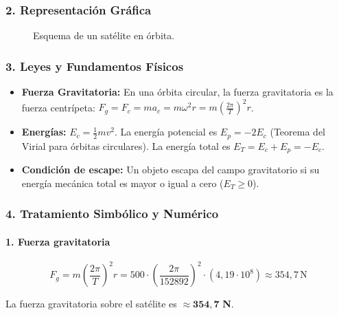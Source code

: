 \subsubsection*{2. Representación Gráfica}
\begin{figure}[H]
    \centering
    \caption{Esquema de un satélite en órbita.}
\end{figure}

\subsubsection*{3. Leyes y Fundamentos Físicos}
\begin{itemize}
    \item \textbf{Fuerza Gravitatoria:} En una órbita circular, la fuerza gravitatoria es la fuerza centrípeta: $F_g = F_c = m a_c = m \omega^2 r = m \left(\frac{2\pi}{T}\right)^2 r$.
    \item \textbf{Energías:} $E_c = \frac{1}{2}mv^2$. La energía potencial es $E_p = -2E_c$ (Teorema del Virial para órbitas circulares). La energía total es $E_T = E_c + E_p = -E_c$.
    \item \textbf{Condición de escape:} Un objeto escapa del campo gravitatorio si su energía mecánica total es mayor o igual a cero ($E_T \ge 0$).
\end{itemize}

\subsubsection*{4. Tratamiento Simbólico y Numérico}
\paragraph*{1. Fuerza gravitatoria}
$$F_g = m \left(\frac{2\pi}{T}\right)^2 r = 500 \cdot \left(\frac{2\pi}{152892}\right)^2 \cdot (4,19 \cdot 10^8) \approx 354,7 \, \text{N}$$
\begin{cajaresultado}
    La fuerza gravitatoria sobre el satélite es $\boldsymbol{\approx 354,7}$ \textbf{N}.
\end{cajaresultado}

